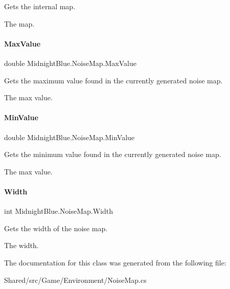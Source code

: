 Gets the internal map. 

The map.\hypertarget{class_midnight_blue_1_1_noise_map_ac7a1a8a255b1512b1d09751b68636a32}{}\label{class_midnight_blue_1_1_noise_map_ac7a1a8a255b1512b1d09751b68636a32} 
\paragraph{\texorpdfstring{Max\+Value}{MaxValue}}
{\footnotesize\ttfamily double Midnight\+Blue.\+Noise\+Map.\+Max\+Value\hspace{0.3cm}{\ttfamily [get]}}



Gets the maximum value found in the currently generated noise map. 

The max value.\hypertarget{class_midnight_blue_1_1_noise_map_a4b3978175deb42036e5a5e4f0ce5692e}{}\label{class_midnight_blue_1_1_noise_map_a4b3978175deb42036e5a5e4f0ce5692e} 
\paragraph{\texorpdfstring{Min\+Value}{MinValue}}
{\footnotesize\ttfamily double Midnight\+Blue.\+Noise\+Map.\+Min\+Value\hspace{0.3cm}{\ttfamily [get]}}



Gets the minimum value found in the currently generated noise map. 

The max value.\hypertarget{class_midnight_blue_1_1_noise_map_a09a672256f9fb4c529e8052e428c18d2}{}\label{class_midnight_blue_1_1_noise_map_a09a672256f9fb4c529e8052e428c18d2} 
\paragraph{\texorpdfstring{Width}{Width}}
{\footnotesize\ttfamily int Midnight\+Blue.\+Noise\+Map.\+Width\hspace{0.3cm}{\ttfamily [get]}}



Gets the width of the noise map. 

The width.

The documentation for this class was generated from the following file\+:\begin{DoxyCompactItemize}
\item 
Shared/src/\+Game/\+Environment/Noise\+Map.\+cs\end{DoxyCompactItemize}
